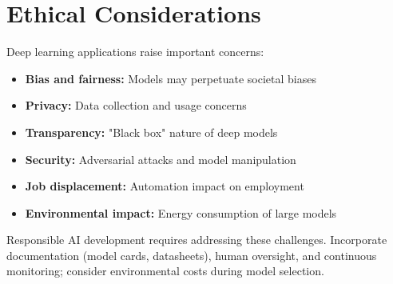 
\section{Ethical Considerations}
\label{sec:ethics}

Deep learning applications raise important concerns:

\begin{itemize}
    \item \textbf{Bias and fairness:} Models may perpetuate societal biases
    \item \textbf{Privacy:} Data collection and usage concerns
    \item \textbf{Transparency:} "Black box" nature of deep models
    \item \textbf{Security:} Adversarial attacks and model manipulation
    \item \textbf{Job displacement:} Automation impact on employment
    \item \textbf{Environmental impact:} Energy consumption of large models
\end{itemize}

Responsible AI development requires addressing these challenges. Incorporate documentation (model cards, datasheets), human oversight, and continuous monitoring; consider environmental costs during model selection.


